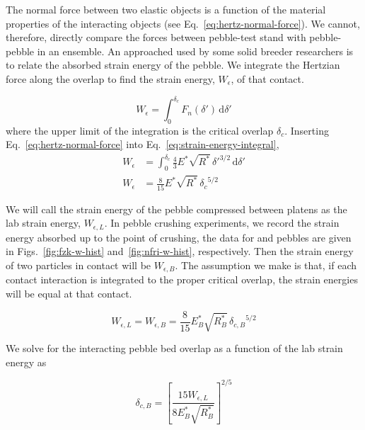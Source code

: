 The normal force between two elastic objects is a function of the material properties of the interacting objects (see Eq.~\ref{eq:hertz-normal-force}). We cannot, therefore, directly compare the forces between pebble-test stand with pebble-pebble in an ensemble. An approached used by some solid breeder researchers is to relate the absorbed strain energy of the pebble\cite{Zhao2013,Annabattula2012a}. We integrate the Hertzian force along the overlap to find the strain energy, $W_\epsilon$, of that contact. 

\begin{equation}\label{eq:strain-energy-integral}
	W_\epsilon = \int_0^{\delta_c}\!F_n(\delta')\,\mathrm{d}\delta'
\end{equation}
where the upper limit of the integration is the critical overlap $\delta_c$. Inserting Eq.~\ref{eq:hertz-normal-force} into Eq.~\ref{eq:strain-energy-integral},
\begin{align}
	W_\epsilon& = \int_0^{\delta_c}\!  \frac{4}{3}E^*\sqrt{R^*}\,\delta'^{3/2} \,\mathrm{d}\delta' \\
	W_\epsilon & = \frac{8}{15}E^*\sqrt{R^*}\, {\delta_c}^{5/2}
\end{align}

We will call the strain energy of the pebble compressed between platens as the lab strain energy, $W_{\epsilon,L}$. In pebble crushing experiments, we record the strain energy absorbed up to the point of crushing, the data for \lis and \lit pebbles are given in Figs.~\ref{fig:fzk-w-hist} and~\ref{fig:nfri-w-hist}, respectively. Then the strain energy of two particles in contact will be $W_{\epsilon,B}$. The assumption we make is that, if each contact interaction is integrated to the proper critical overlap, the strain energies will be equal at that contact.

\begin{equation}
	W_{\epsilon,L} = W_{\epsilon,B} = \frac{8}{15}E_B^*\sqrt{R_B^*}\, {\delta_{c,B}}^{5/2}
\end{equation}

We solve for the interacting pebble bed overlap as a function of the lab strain energy as

\begin{equation}
	\delta_{c,B} = \left[\frac{15W_{\epsilon,L}}{8E_B^*\sqrt{R_B^*}}\right]^{2/5}
\end{equation}

